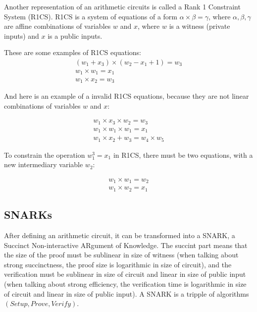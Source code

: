 \documentclass[conference,comsoc,10pt]{IEEEtran}
\begin{document}
        Another representation of an arithmetic circuits is called a Rank 1 Constraint
        System (R1CS). R1CS is a system of equations of a form $\alpha \times \beta = \gamma$,
        where $\alpha, \beta, \gamma$ are affine combinations of variables $w$ and $x$,
        where $w$ is a witness (private inputs) and $x$ is a public inputs.

        These are some examples of R1CS equations:
        \begin{displaymath}
            \begin{array}{l}
                (w_1 + x_3) \times (w_2 - x_1 + 1) = w_3 \\
                w_1 \times w_1 = x_1                     \\
                w_1 \times x_2 = w_3
            \end{array}
        \end{displaymath}

        And here is an example of a invalid R1CS equations, because they are not linear
        combinations of variables $w$ and $x$:

        \begin{displaymath}
            \begin{array}{l}
                w_1 \times x_3 \times w_2 = w_3 \\
                w_1 \times w_1 \times w_1 = x_1 \\
                w_1 \times x_2 + w_3 = w_4 \times w_5
            \end{array}
        \end{displaymath}

        To constrain the operation $w_1^3 = x_1$ in R1CS, there must be two equations, with
        a new intermediary variable $w_2$:

        \begin{displaymath}
            \begin{array}{l}
                w_1 \times w_1 = w_2 \\
                w_1 \times w_2 = x_1
            \end{array}
        \end{displaymath}

    \subsection{SNARKs}

        After defining an arithmetic circuit, it can be transformed into a SNARK,
        a Succinct Non-interactive ARgument of Knowledge. The succint part means that
        the size of the proof must be sublinear in size of witness (when talking about
        strong succinctness, the proof size is logarithmic in size of circuit), and
        the verification must be sublinear in size of circuit and linear in size of
        public input (when talking about strong efficiency, the verification time is
        logarithmic in size of circuit and linear in size of public input).
        A SNARK is a tripple of algorithms $(Setup, Prove, Verify)$\cite{Groth16}.
\end{document}
